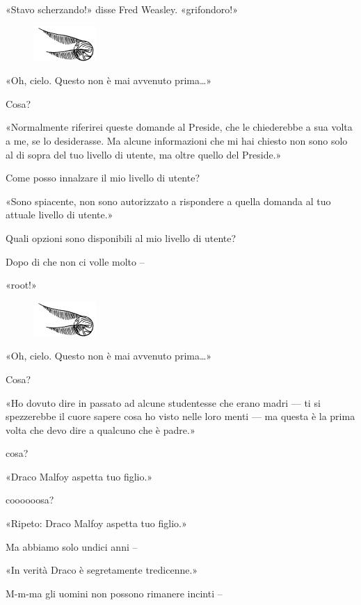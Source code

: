 «Stavo scherzando!» disse Fred Weasley. «grifondoro!»

\begin{figure}[h]
	\includegraphics[scale=0.4]{boccino.png}
	\centering
\end{figure}

«Oh, cielo. Questo non è mai avvenuto prima…»

Cosa?

«Normalmente riferirei queste domande al Preside, che le chiederebbe a sua volta a me, se lo desiderasse. Ma alcune informazioni che mi hai chiesto non sono solo al di sopra del tuo livello di utente, ma oltre quello del Preside.»

Come posso innalzare il mio livello di utente?

«Sono spiacente, non sono autorizzato a rispondere a quella domanda al tuo attuale livello di utente.»

Quali opzioni sono disponibili al mio livello di utente?

Dopo di che non ci volle molto –

«root!»

\begin{figure}[h]
	\includegraphics[scale=0.4]{boccino.png}
	\centering
\end{figure}

«Oh, cielo. Questo non è mai avvenuto prima…»

Cosa?

«Ho dovuto dire in passato ad alcune studentesse che erano madri — ti si spezzerebbe il cuore sapere cosa ho visto nelle loro menti — ma questa è la prima volta che devo dire a qualcuno che è padre.»

cosa?

«Draco Malfoy aspetta tuo figlio.»

coooooosa?

«Ripeto: Draco Malfoy aspetta tuo figlio.»

Ma abbiamo solo undici anni –

«In verità Draco è segretamente tredicenne.»

M-m-ma gli uomini non possono rimanere incinti –

